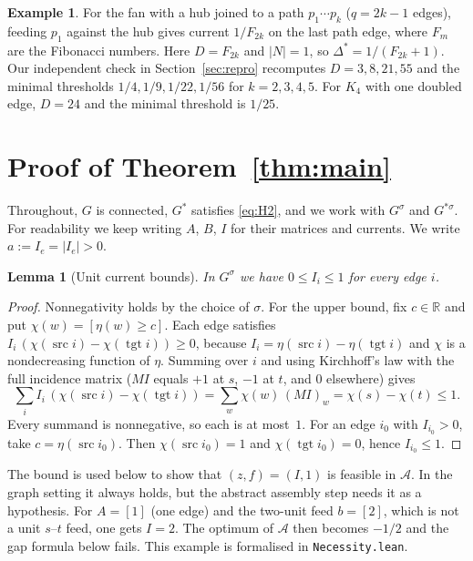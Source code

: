\documentclass[11pt]{amsart}
\theoremstyle{plain}
\newtheorem{lemma}[theorem]{Lemma}
\theoremstyle{definition}
\newtheorem{example}{Example}
\theoremstyle{remark}
\newcommand{\R}{\mathbb{R}}
\newcommand{\src}{\operatorname{src}}
\newcommand{\tgt}{\operatorname{tgt}}
\newcommand{\code}[1]{\texttt{#1}}
\begin{document}
\begin{example}\label{ex:fan}
For the fan with a hub joined to a path $p_1\cdots p_k$ ($q=2k-1$ edges), feeding $p_1$ against the hub gives
current $1/F_{2k}$ on the last path edge, where $F_m$ are the Fibonacci numbers. Here $D=F_{2k}$ and $|N|=1$, so
$\Delta^*=1/(F_{2k}+1)$. Our independent check in Section~\ref{sec:repro} recomputes $D=3,8,21,55$ and the
minimal thresholds $1/4,1/9,1/22,1/56$ for $k=2,3,4,5$. For $K_4$ with one doubled edge, $D=24$ and the minimal
threshold is $1/25$.
\end{example}

\section{Proof of Theorem~\ref{thm:main}}\label{sec:proof}

Throughout, $G$ is connected, $G^\ast$ satisfies \eqref{eq:H2}, and we work with $G^\sigma$ and $G^{\ast\sigma}$.
For readability we keep writing $A$, $B$, $I$ for their matrices and currents. We write $a:=I_e=|I_e|>0$.

\begin{lemma}[Unit current bounds]\label{lem:01}
In $G^\sigma$ we have $0\le I_i\le 1$ for every edge $i$.
\end{lemma}
\begin{proof}
Nonnegativity holds by the choice of $\sigma$. For the upper bound, fix $c\in\R$ and put
$\chi(w)=[\eta(w)\ge c]$. Each edge satisfies $I_i\,(\chi(\src i)-\chi(\tgt i))\ge 0$, because
$I_i=\eta(\src i)-\eta(\tgt i)$ and $\chi$ is a nondecreasing function of $\eta$. Summing over $i$ and using
Kirchhoff's law with the full incidence matrix ($MI$ equals $+1$ at $s$, $-1$ at $t$, and $0$ elsewhere) gives
\[
\sum_i I_i\,(\chi(\src i)-\chi(\tgt i))=\sum_w\chi(w)\,(MI)_w=\chi(s)-\chi(t)\le 1 .
\]
Every summand is nonnegative, so each is at most~$1$. For an edge $i_0$ with $I_{i_0}>0$, take
$c=\eta(\src i_0)$. Then $\chi(\src i_0)=1$ and $\chi(\tgt i_0)=0$, hence $I_{i_0}\le 1$.
\end{proof}

The bound is used below to show that $(z,f)=(I,1)$ is feasible in $\mathcal A$. In the graph setting it always
holds, but the abstract assembly step needs it as a hypothesis. For $A=[1]$ (one edge) and the two-unit feed
$b=[2]$, which is not a unit $s$--$t$ feed, one gets $I=2$. The optimum of $\mathcal A$ then becomes $-1/2$ and the
gap formula below fails. This example is formalised in \code{Necessity.lean}.
\end{document}
